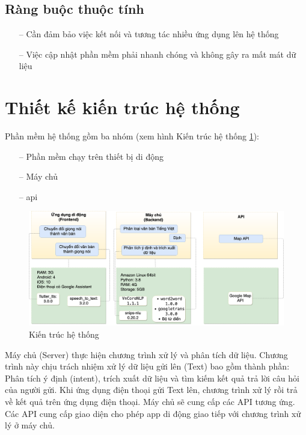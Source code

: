 \subsection{Ràng buộc thuộc tính}
\begin{itemize}
    \item[--] Cần đảm bảo việc kết nối và tương tác nhiều ứng dụng lên hệ thống
    \item[--] Việc cập nhật phần mềm phải nhanh chóng và không gây ra mất mát dữ liệu
\end{itemize}

\section{Thiết kế kiến trúc hệ thống}
Phần mềm hệ thống gồm ba nhóm (xem hình Kiến trúc hệ thống \ref{fig:kien-truc-he-thong}):
\begin{itemize}
    \item[--] Phần mềm chạy trên thiết bị di động
    \item[--] Máy chủ
    \item[--] \ac{api}
\end{itemize}
\begin{figure}[htp]
    \centering
    \includegraphics[width=15cm]{images/Structure-System.png}
    \caption{Kiến trúc hệ thống}
    \label{fig:kien-truc-he-thong}
\end{figure}

Máy chủ (Server) thực hiện chương trình xử lý và phân tích dữ liệu. Chương trình này chịu trách nhiệm xử lý dữ liệu gửi lên (Text) bao gồm thành phần: Phân tích ý định (intent), trích xuất dữ liệu và tìm kiếm kết quả trả lời câu hỏi của người gửi. Khi ứng dụng điện thoại gửi Text lên, chương trình xử lý rồi trả về kết quả trên ứng dụng điện thoại. Máy chủ sẽ cung cấp các API tương ứng. Các API cung cấp giao diện cho phép app di động giao tiếp với chương trình xử lý ở máy chủ.

